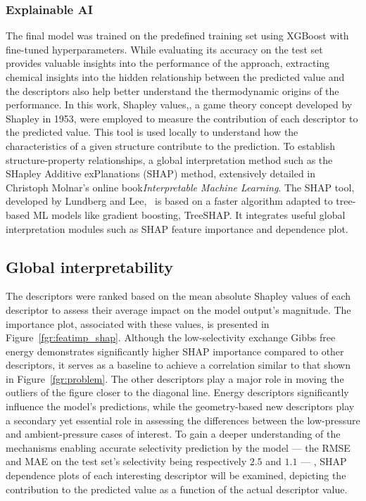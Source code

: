 \documentclass[main]{subfiles}
\begin{document}
\subsubsection{Explainable AI}

The final model was trained on the predefined training set using XGBoost with fine-tuned hyperparameters. While evaluating its accuracy on the test set provides valuable insights into the performance of the approach, extracting chemical insights into the hidden relationship between the predicted value and the descriptors also help better understand the thermodynamic origins of the performance. In this work, Shapley values,\autocite{shapley1953value}, a game theory concept developed by Shapley in 1953, were employed to measure the contribution of each descriptor to the predicted value. This tool is used locally to understand how the characteristics of a given structure contribute to the prediction. To establish structure-property relationships, a global interpretation method such as the SHapley Additive exPlanations (SHAP) method, extensively detailed in Christoph Molnar's online book\emph{Interpretable Machine Learning}.\autocite{molnar2020interpretable} The SHAP tool, developed by Lundberg and Lee,~\autocite{SHAP} is based on a faster algorithm adapted to tree-based ML models like gradient boosting, TreeSHAP. It integrates useful global interpretation modules such as SHAP feature importance and dependence plot.

\subsection{Global interpretability}

The descriptors were ranked based on the mean absolute Shapley values of each descriptor to assess their average impact on the model output's magnitude. The importance plot, associated with these values, is presented in Figure~\ref{fgr:featimp_shap}. Although the low-selectivity exchange Gibbs free energy demonstrates significantly higher SHAP importance compared to other descriptors, it serves as a baseline to achieve a correlation similar to that shown in Figure~\ref{fgr:problem}. The other descriptors play a major role in moving the outliers of the figure closer to the diagonal line. Energy descriptors significantly influence the model's predictions, while the geometry-based new descriptors play a secondary yet essential role in assessing the differences between the low-pressure and ambient-pressure cases of interest. To gain a deeper understanding of the mechanisms enabling accurate selectivity prediction by the model --- the RMSE and MAE on the test set's selectivity being respectively $2.5$ and $1.1$ --- , SHAP dependence plots of each interesting descriptor will be examined, depicting the contribution to the predicted value as a function of the actual descriptor value.
\end{document}
